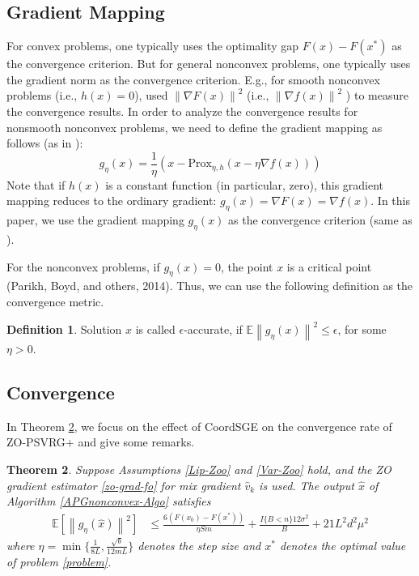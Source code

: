 \documentclass{article}
\newcommand*{\Po}{\text{Prox}}
\newcommand*{\E}{\mathbb{E}}
\newcommand{\norm}[1]{\left\lVert#1\right\rVert}
\newtheorem{theorem}{Theorem}[section]
\theoremstyle{definition}
\newtheorem{definition}[theorem]{Definition}
\theoremstyle{remark}
\begin{document}
\subsection{Gradient Mapping}
{\color{Violet}
For convex problems, one typically uses the optimality gap $F(x) - F(x^*)$ as the convergence criterion. But for general nonconvex problems, one typically uses the gradient norm as the convergence
criterion. E.g., for smooth nonconvex problems (i.e., $h(x) = 0$), \cite{ghadimi2013stochastic,reddi2016stochastic,
lei2017non,liu2018zeroth}  used $\norm{\nabla F(x)}^2$ (i.e., $\norm{\nabla f(x)}^2$ ) to measure the convergence results. In order to analyze the
convergence results for nonsmooth nonconvex problems, we need to define the gradient mapping as follows (as in \cite{ghadimi2016accelerated,reddi2016proximal,huang2019faster}):
\begin{equation}
g_{\eta}(x) = \frac{1}{\eta}(x-\Po_{\eta,h}(x-\eta \nabla f(x)))
\end{equation}
Note that if $h(x)$ is a constant function (in particular, zero), this gradient mapping reduces to the ordinary gradient:
$g_{\eta}(x) = \nabla F(x) = \nabla f(x)$. In this paper, we use the gradient mapping $g_{\eta}(x)$ as the convergence criterion (same as
\cite{ghadimi2016accelerated,reddi2016proximal,parikh2014proximal}).}
{\color{Green}
For the nonconvex problems, if $g_{\eta}(x) = 0$, the point $x$ is a critical point (Parikh, Boyd, and others, 2014). Thus, we can
use the following definition as the convergence metric.
\begin{definition}
Solution $x$ is called $\epsilon$-accurate, if $\E\norm{g_{\eta}(x)}^2 \leq \epsilon$, for some $\eta > 0$.
\end{definition}
}
\subsection{Convergence}
In Theorem \ref{noncon-zoo-coord}, we focus on the effect of CoordSGE on the convergence rate of ZO-PSVRG+ and give some remarks.

\begin{theorem}\label{noncon-zoo-coord}
Suppose Assumptions \ref{Lip-Zoo} and \ref{Var-Zoo} hold, and the ZO gradient estimator \eqref{zo-grad-fo} for mix gradient $\hat{v}_k$ is used. The output $\hat{x}$ of Algorithm \ref{APGnonconvex-Algo} satisfies
  \begin{equation}\label{noncon-zoo-main}
  \begin{split}
\E[\norm{g_{\eta}(\hat{x})}^2] & \leq \frac{6\left(F(x_0) - F({x}^*)\right)}{\eta Sm} + \frac{I\{B < n\}12\sigma ^2}{B}+21{L^2 d^2 \mu^2}
\end{split}
 \end{equation}
where $\eta = \min\{\frac{1}{8L}, \frac{\sqrt{b}}{12mL}\}$ denotes the step size and $x^*$ denotes the optimal value of problem \ref{problem}.
\end{theorem}
\end{document}
